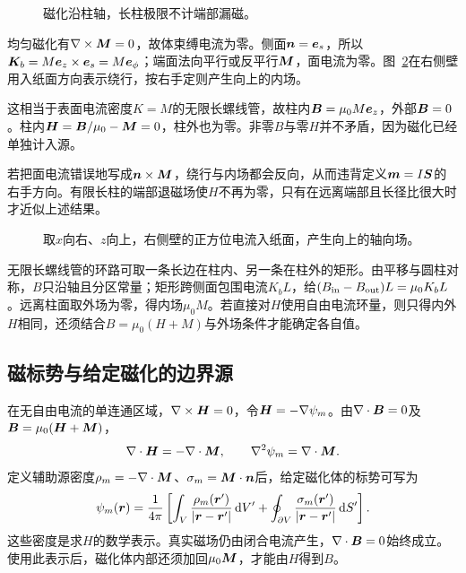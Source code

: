 \begin{figure}[H]\centering
{}
\caption{磁化沿柱轴，长柱极限不计端部漏磁。}\label{fig:es4-e12-q}
\end{figure}
\begin{solution}
均匀磁化有$\nabla\times\bm{M}=0$，故体束缚电流为零。侧面$\bm{n}=\bm{e}_s$，所以$\bm{K}_b=M\bm{e}_z\times\bm{e}_s=M\bm{e}_\phi$；端面法向平行或反平行$\bm{M}$，面电流为零。图~\ref{fig:es4-e12-s}在右侧壁用入纸面方向表示绕行，按右手定则产生向上的内场。

这相当于表面电流密度$K=M$的无限长螺线管，故柱内$\bm{B}=\mu_0M\bm{e}_z$，外部$\bm{B}=0$。柱内$\bm{H}=\bm{B}/\mu_0-\bm{M}=0$，柱外也为零。非零$B$与零$H$并不矛盾，因为磁化已经单独计入源。

若把面电流错误地写成$\bm{n}\times\bm{M}$，绕行与内场都会反向，从而违背定义$\bm{m}=I\bm{S}$的右手方向。有限长柱的端部退磁场使$H$不再为零，只有在远离端部且长径比很大时才近似上述结果。
\begin{figure}[H]\centering
{}
\caption{取$x$向右、$z$向上，右侧壁的正方位电流入纸面，产生向上的轴向场。}\label{fig:es4-e12-s}
\end{figure}


无限长螺线管的环路可取一条长边在柱内、另一条在柱外的矩形。由平移与圆柱对称，$B$只沿轴且分区常量；矩形跨侧面包围电流$K_bL$，给$(B_{\rm in}-B_{\rm out})L=\mu_0K_bL$。远离柱面取外场为零，得内场$\mu_0M$。若直接对$H$使用自由电流环量，则只得内外$H$相同，还须结合$B=\mu_0(H+M)$与外场条件才能确定各自值。
\end{solution}

\subsection{磁标势与给定磁化的边界源}
在无自由电流的单连通区域，$\nabla\times\bm{H}=0$，令$\bm{H}=-\nabla\psi_m$。由$\nabla\cdot\bm{B}=0$及$\bm{B}=\mu_0(\bm{H}+\bm{M})$，
\[\nabla\cdot\bm{H}=-\nabla\cdot\bm{M},
\qquad \nabla^2\psi_m=\nabla\cdot\bm{M}.
\]
定义辅助源密度$\rho_m=-\nabla\cdot\bm{M}$、$\sigma_m=\bm{M}\cdot\bm{n}$后，给定磁化体的标势可写为
\[\psi_m(\bm{r})=\frac1{4\pi}\left[
\int_V\frac{\rho_m(\bm{r}')}{|\bm{r}-\bm{r}'|}\mathop{}\!\mathrm d V'
+\oint_{\partial V}\frac{\sigma_m(\bm{r}')}{|\bm{r}-\bm{r}'|}\mathop{}\!\mathrm d S'\right].
\]
这些密度是求$H$的数学表示。真实磁场仍由闭合电流产生，$\nabla\cdot\bm{B}=0$始终成立。使用此表示后，磁化体内部还须加回$\mu_0\bm{M}$，才能由$H$得到$B$。

